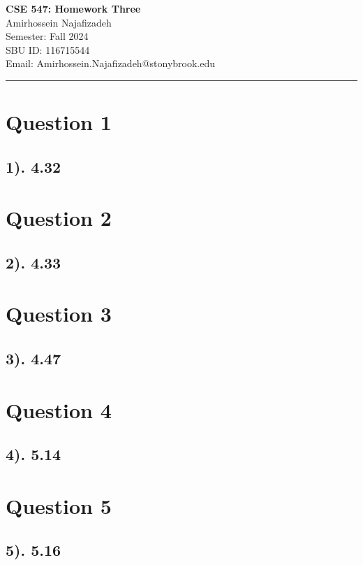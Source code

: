 \documentclass[12pt]{article}
\begin{document}
\begin{center}
    {\LARGE\textbf{CSE 547: Homework Three}} \\[1em]
    {\large Amirhossein Najafizadeh} \\[1em]
    Semester: Fall 2024 \\ 
    SBU ID: 116715544 \\
    Email: Amirhossein.Najafizadeh@stonybrook.edu \\[1em]
    \noindent\rule{\textwidth}{0.6pt}
\end{center}

\section*{Question 1}
\subsection*{1). 4.32}

\section*{Question 2}
\subsection*{2). 4.33}

\section*{Question 3}
\subsection*{3). 4.47}

\section*{Question 4}
\subsection*{4). 5.14}

\section*{Question 5}
\subsection*{5). 5.16}
\end{document}
